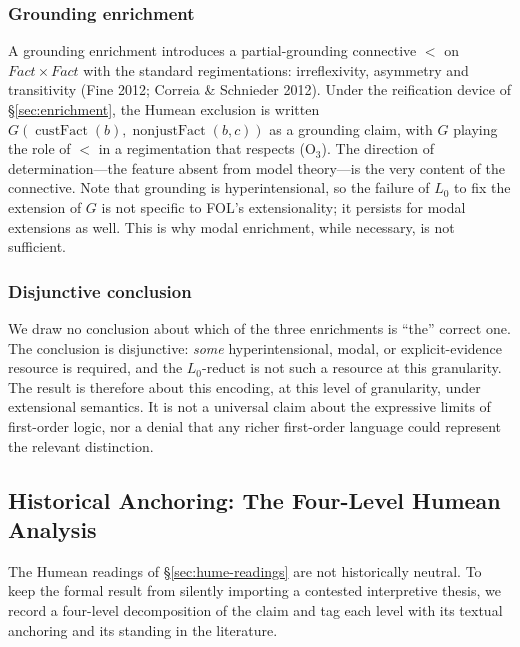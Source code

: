 \subsubsection{Grounding enrichment}
\label{sec:grounding-enrichment}

A grounding enrichment introduces a partial-grounding connective
$<$ on $\mathit{Fact}\times\mathit{Fact}$ with the standard
regimentations: irreflexivity, asymmetry and transitivity
(Fine 2012; Correia \& Schnieder 2012). Under the reification
device of \S\ref{sec:enrichment}, the Humean exclusion is written
$G(\operatorname{custFact}(b),\operatorname{nonjustFact}(b,c))$ as a
grounding claim, with $G$ playing the role of $<$ in a regimentation
that respects (O$_3$). The direction of determination---the feature
absent from model theory---is the very content of the connective.
Note that grounding is hyperintensional, so the failure of $L_0$ to
fix the extension of $G$ is not specific to FOL's extensionality;
it persists for modal extensions as well. This is why modal
enrichment, while necessary, is not sufficient.

\subsubsection{Disjunctive conclusion}
\label{sec:disjunctive}

We draw no conclusion about which of the three enrichments is
``the'' correct one. The conclusion is disjunctive: \emph{some}
hyperintensional, modal, or explicit-evidence resource is required,
and the $L_0$-reduct is not such a resource at this granularity.
The result is therefore about this encoding, at this level of
granularity, under extensional semantics. It is not a universal
claim about the expressive limits of first-order logic, nor a
denial that any richer first-order language could represent the
relevant distinction.

\subsection{Historical Anchoring: The Four-Level Humean Analysis}
\label{sec:hume-historical}

The Humean readings of \S\ref{sec:hume-readings} are not
historically neutral. To keep the formal result from silently
importing a contested interpretive thesis, we record a four-level
decomposition of the claim and tag each level with its textual
anchoring and its standing in the literature.

